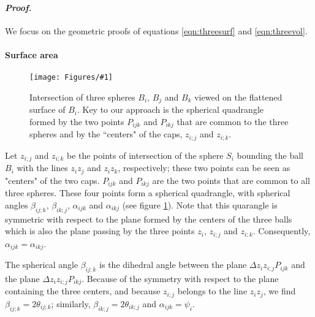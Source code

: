 \documentclass[11 pt]{article}
\theoremstyle{plain} \theorembodyfont{\rmfamily}
\newcommand{\centerfig}[2]{%
\centerline{\texttt{[image: Figures/\#1]}}
}
\begin{document}
\paragraph{\emph{Proof.}}  We focus on the geometric proofs of equations \ref{eqn:threesurf} and \ref{eqn:threevol}.
\paragraph{Surface area}

\begin{figure}[!hbt]
	\centerfig{ThreeSphere2}{width=2.5 in}
\caption{Intersection of three spheres $B_i$, $B_j$ and $B_k$ viewed on the flattened surface of  $B_i$. 
	Key to our approach is the spherical quadrangle formed by the two points $P_{ijk}$ and $P_{ikj}$ that are common to the three spheres and by the ``centers" of the caps, $z_{i;j}$ and $z_{i;k}$.}
	\label{fig:2cap}
\end{figure}

Let  $z_{i;j}$ and $z_{i;k}$ be the points of intersection of the sphere $S_i$ bounding the ball $B_i$ with the lines $z_iz_j$ and $z_iz_k$, respectively; these two points can be seen as "centers" of the two caps.
$P_{ijk}$ and $P_{ikj}$ are the two points that are common to all three spheres. These four points form a spherical quadrangle, with spherical angles $\beta_{ij;k}$, $\beta_{ik;j}$,
$\alpha_{ijk}$ and $\alpha_{ikj}$ (see figure \ref{fig:2cap}).
Note that this quarangle is symmetric with respect to the plane formed by the centers of the three balls which is also the plane passing by the three points $z_i$, $z_{i;j}$ and $z_{i:k}$.  Consequently,
$\alpha_{ijk}=\alpha_{ikj}$.

The spherical angle $\beta_{ij;k}$ is the dihedral angle between the plane $\Delta z_i z_{i;j} P_{ijk}$
and the plane $\Delta z_i z_{i;j} P_{ikj}$. Because of the symmetry with respect to the plane containing the three centers, and because $z_{i;j}$ belongs to the line $z_i z_j$, we find $\beta_{ij;k} = 2 \theta_{ij;k}$; similarly, $\beta_{ik;j} = 2 \theta_{ik;j}$ and $\alpha_{ijk} = \psi_{i}$.
\end{document}
